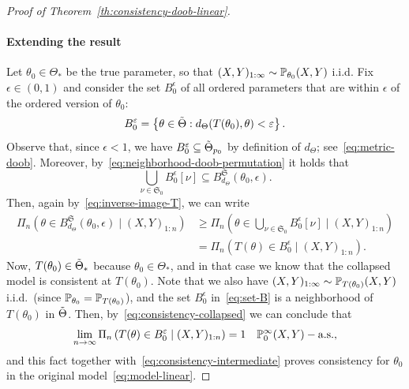 \begin{proof}[Proof of Theorem~\ref{th:consistency-doob-linear}]
\paragraph{Extending the result} Let \(\theta_0\in\Theta_*\) be the true parameter, so that \((X,Y)_{1:\infty}\sim \mathbb{P}_{\theta_0}(X, Y)\) i.i.d. Fix \(\epsilon\in(0,1)\) and consider the set \(B_0^\epsilon\) of all ordered parameters that are within \(\epsilon\) of the ordered version of \(\theta_0\):
\begin{equation}\label{eq:set-B}
  B_0^\varepsilon = \left\{ \theta \in \tilde{\Theta}: d_\Theta(T(\theta_0), \theta) < \varepsilon \right\}.
\end{equation}
Observe that, since \(\epsilon < 1\), we have \(B_0^\varepsilon\subseteq \tilde{\Theta}_{p_0}\) by definition of \(d_\Theta\); see~\eqref{eq:metric-doob}. Moreover, by~\eqref{eq:neighborhood-doob-permutation} it holds that
\[
  \bigcup_{\nu\in \mathfrak{S}_{0}}B_0^\epsilon[\nu]\subseteq B_{d_\Theta}^{\mathfrak{S}}(\theta_0, \epsilon).
\]  
Then, again by~\eqref{eq:inverse-image-T}, we can write
\begin{equation}\label{eq:consistency-intermediate}
  \begin{split}
    \Pi_n\left(\theta \in B_{d_\Theta}^{\mathfrak{S}}(\theta_0, \epsilon) \mid (X,Y)_{1:n}\right) & \geq \Pi_n\left(\theta \in \bigcup_{\nu\in \mathfrak{S}_{0}} B_0^\epsilon[\nu] \mid (X,Y)_{1:n}\right) \\
    & = \Pi_n\left(T(\theta) \in B_0^\epsilon \mid (X,Y)_{1:n}\right).
  \end{split}
\end{equation}
Now, \(T(\theta_0)\in{\tilde{\Theta}_*}\) because \(\theta_0\in\Theta_*\), and in that case we know that the collapsed model is consistent at \(T(\theta_0)\). Note that we also have \((X,Y)_{1:\infty} \sim \mathbb{P}_{T(\theta_0)}(X, Y)\) i.i.d.\ (since \(\mathbb{P}_{\theta_0}=\mathbb{P}_{T(\theta_0)}\)), and the set \(B_0^\epsilon\) in~\eqref{eq:set-B} is a neighborhood of \(T(\theta_0)\) in \(\tilde{\Theta}\). Then, by~\eqref{eq:consistency-collapsed} we can conclude that 
\[
  \lim_{n\to\infty} \Pi_n\left(T(\theta) \in B_0^\varepsilon \mid (X,Y)_{1:n}\right) = 1 \quad \mathbb{P}_0^\infty (X,Y)-\text{a.s.},
\]
and this fact together with~\eqref{eq:consistency-intermediate} proves consistency for \(\theta_0\) in the original model~\eqref{eq:model-linear}.
\end{proof}

